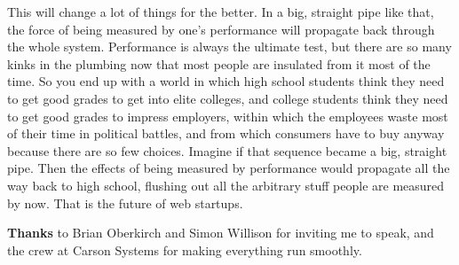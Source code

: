 This will change a lot
                    of things for the better. In a big, straight pipe like that,
                    the force of being measured by one's performance will
                    propagate back through the whole system. Performance is
                    always the ultimate test, but there are so many kinks in the
                    plumbing now that most people are insulated from it most of
                    the time. So you end up with a world in which high school
                    students think they need to get good grades to get into
                    elite colleges, and college students think they need to get
                    good grades to impress employers, within which the employees
                    waste most of their time in political battles, and from
                    which consumers have to buy anyway because there are so few
                    choices. Imagine if that sequence became a big, straight
                    pipe. Then the effects of being measured by performance
                    would propagate all the way back to high school, flushing
                    out all the arbitrary stuff people are measured by now. That
                    is the future of web startups.





\textbf{Thanks}
                    to Brian Oberkirch and Simon Willison for inviting me to
                    speak, and the crew at Carson Systems for making everything
                    run smoothly.



              
            
          

